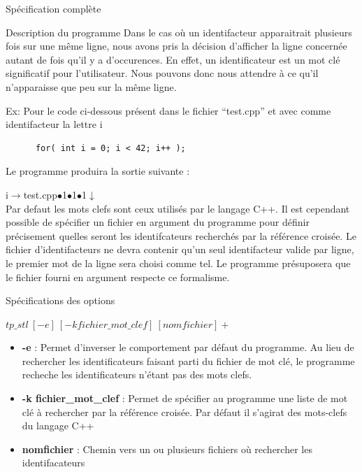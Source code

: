 \documentclass{article}
\begin{document}
\begin{section}{Spécification complète}
\begin{subsection}{Description du programme}
    Dans le cas où un identifacteur apparaitrait plusieurs fois sur une même ligne, nous avons pris la décision d'afficher
    la ligne concernée autant de fois qu'il y a d'occurences. En effet, un identificateur est un mot clé significatif pour l'utilisateur.
    Nous pouvons donc nous attendre à ce qu'il n'apparaisse que peu sur la même ligne.
    
    Ex: Pour le code ci-dessous présent dans le fichier ``test.cpp'' et avec comme identifacteur la lettre i 
    
    \begin{verbatim}
      for( int i = 0; i < 42; i++ );
    \end{verbatim}
    Le programme produira la sortie suivante : 

    i$\xrightarrow{}$test.cpp$\bullet$1$\bullet$1$\bullet$1$\downarrow$ \\
    
    Par defaut les mots clefs sont ceux utilisés par le langage C++. Il est cependant possible de spécifier
    un fichier en argument du programme pour définir précisement quelles seront les identifcateurs recherchés par la référence
    croisée. Le fichier d'identifacteurs ne devra contenir qu'un seul identifacteur valide par ligne, le premier mot de la ligne sera choisi comme tel. Le programme présuposera que
    le fichier fourni en argument respecte ce formalisme.
    
    
  \end{subsection}

  
  \newpage
  \begin{subsection}{Spécifications des options}
    \begin{center}
      \textbf{$tp\_stl\ [-e]\ [-k fichier\_mot\_clef]\ [nomfichier]+$}
    \end{center}

    \begin{itemize}
      \item[] \textbf{-e} : Permet d'inverser le comportement par défaut du programme.
			    Au lieu de rechercher les identificateurs faisant parti du fichier de mot clé, le programme recheche
			    les identificateurs n'étant pas des mots clefs.

      
      \item[] \textbf{-k fichier\_mot\_clef} : Permet de spécifier au programme une liste de mot clé à rechercher par la référence croisée.
					       Par défaut il s'agirat des mots-clefs du langage C++ 

      \item[] \textbf{nomfichier} : Chemin vers un ou plusieurs fichiers où rechercher les identifacateurs
    \end{itemize}

  \end{subsection}

\end{section}
\end{document}
